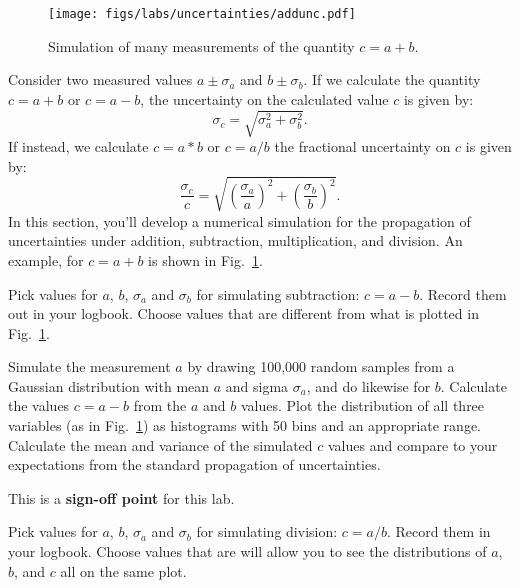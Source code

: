 \begin{figure}[htbp]
\begin{center}
\texttt{[image: figs/labs/uncertainties/addunc.pdf]}\\
\end{center}
\caption{\label{fig:addunc} Simulation of many measurements of the quantity $c = a + b$. }
\end{figure}

Consider two measured values $a \pm \sigma_a$ and $b \pm \sigma_b$.  If we calculate the quantity $c = a + b$ or $c = a - b$, the uncertainty on the calculated value $c$ is given by:
\begin{displaymath}
\sigma_c = \sqrt{\sigma_a^2 + \sigma_b^2}.
\end{displaymath}
If instead, we calculate $c = a * b$ or $c = a/b$ the fractional uncertainty on $c$ is given by:
\begin{displaymath}
\frac{\sigma_c}{c} = \sqrt{\left(\frac{\sigma_a}{a}\right)^2 + \left(\frac{\sigma_b}{b}\right)^2}.
\end{displaymath}
In this section, you'll develop a numerical simulation for the
propagation of uncertainties under addition, subtraction,
multiplication, and division.  An example, for $c = a + b$ is shown in Fig.~\ref{fig:addunc}.

Pick values for $a$, $b$, $ \sigma_a$ and $ \sigma_b$ for simulating
subtraction: $c=a-b$. Record them out in your logbook. Choose values
that are different from what is plotted in Fig.~\ref{fig:addunc}.

\begin{plot} 
Simulate the measurement $a$ by drawing 100,000 random samples from a
Gaussian distribution with mean $a$ and sigma $\sigma_a$, and do
likewise for $b$.  Calculate the values $c = a -b $ from the $a$ and
$b$ values.  Plot the distribution of all three variables (as in
Fig.~\ref{fig:addunc}) as histograms with 50 bins and an appropriate
range.  Calculate the mean and variance of the simulated $c$ values
and compare to your expectations from the standard propagation of
uncertainties.
\end{plot} 

This is a \textbf{sign-off point} for this lab. 

Pick values for $a$, $b$, $\sigma_a$ and $\sigma_b$ for simulating
division: $c=a/b$. Record them in your logbook.  Choose values that
are will allow you to see the distributions of $a$, $b$, and $c$ all
on the same plot.

